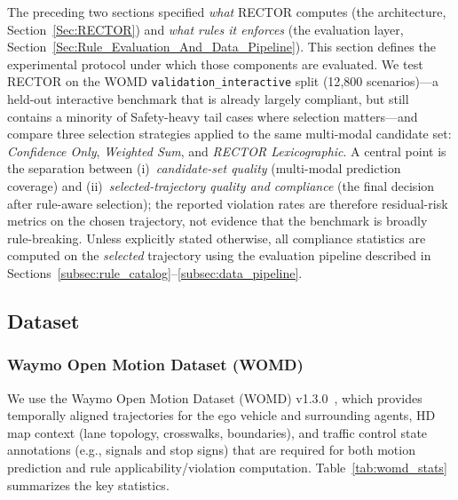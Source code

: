 The preceding two sections specified \emph{what} RECTOR computes (the architecture, Section~\ref{Sec:RECTOR}) and \emph{what rules it enforces} (the evaluation layer, Section~\ref{Sec:Rule_Evaluation_And_Data_Pipeline}). This section defines the experimental protocol under which those components are evaluated.  We test RECTOR on the WOMD \texttt{validation\_interactive} split (12{,}800 scenarios)---a held-out interactive benchmark that is already largely compliant, but still contains a minority of Safety-heavy tail cases where selection matters---and compare three selection strategies applied to the same multi-modal candidate set: \emph{Confidence Only}, \emph{Weighted Sum}, and \emph{RECTOR Lexicographic}.  A central point is the separation between (i)~\emph{candidate-set quality} (multi-modal prediction coverage) and (ii)~\emph{selected-trajectory quality and compliance} (the final decision after rule-aware selection); the reported violation rates are therefore residual-risk metrics on the chosen trajectory, not evidence that the benchmark is broadly rule-breaking. Unless explicitly stated otherwise, all compliance statistics are computed on the \emph{selected} trajectory using the evaluation pipeline described in Sections~\ref{subsec:rule_catalog}--\ref{subsec:data_pipeline}. 
\subsection{Dataset}
\label{subsec:dataset}

\subsubsection{Waymo Open Motion Dataset (WOMD)}

We use the Waymo Open Motion Dataset (WOMD) v1.3.0~\cite{WOMD_20201}, which provides temporally aligned trajectories for the ego vehicle and surrounding agents, HD map context (lane topology, crosswalks, boundaries), and traffic control state annotations (e.g., signals and stop signs) that are required for both motion prediction and rule applicability/violation computation. Table~\ref{tab:womd_stats} summarizes the key statistics.

